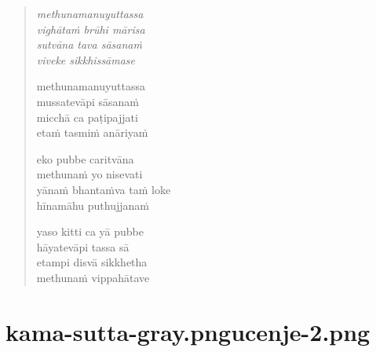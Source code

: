

\cleartoverso

\vspace*{30mm}

\begin{verse}

\emph{methunamanuyuttassa}\\
\emph{vighātaṁ brūhi mārisa}\\
\emph{sutvāna tava sāsanaṁ}\\
\emph{viveke sikkhissāmase}

methunamanuyuttassa\\
mussatevāpi sāsanaṁ\\
micchā ca paṭipajjati\\
etaṁ tasmiṁ anāriyaṁ

eko pubbe caritvāna\\
methunaṁ yo nisevati\\
yānaṁ bhantaṁva taṁ loke\\
hīnamāhu puthujjanaṁ

yaso kitti ca yā pubbe\\
hāyatevāpi tassa sā\\
etampi disvā sikkhetha\\
methunaṁ vippahātave

\end{verse}


\chapter[Tissametteyya Sutta]{{kama-sutta-gray.png}{ucenje-2.png}}


